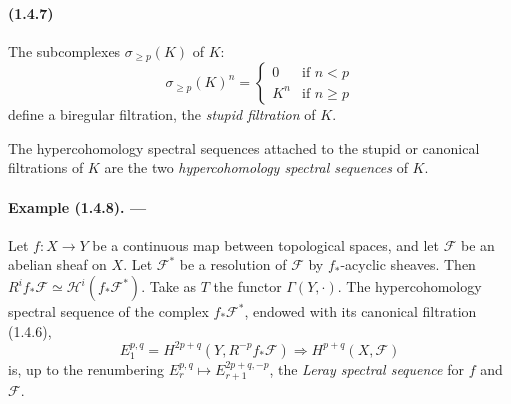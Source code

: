 \documentclass[10pt]{article}
\newcommand{\calH}{\mathcal H}
\newcommand{\calF}{\mathcal F}
\begin{document}
\paragraph{(1.4.7)} The subcomplexes $\sigma_{\ge p}(K)$ of $K$:
\[
\sigma_{\ge p}(K)^n=\begin{cases}
0& \text{if }n<p\\
K^n& \text{if }n\ge p
\end{cases}
\]
define a biregular filtration, the \emph{stupid filtration} of $K$.

The hypercohomology spectral sequences attached to the stupid or canonical filtrations of $K$ are the two \emph{hypercohomology spectral sequences} of $K$.

\paragraph{Example (1.4.8). ---} Let $f:X\to Y$ be a continuous map between topological spaces, and let $\calF$ be an abelian sheaf on $X$. Let $\calF^*$ be a resolution of $\calF$ by $f_*$-acyclic sheaves. Then $R^if_*\calF\simeq\calH^i(f_*\calF^*)$. Take as $T$ the functor $\Gamma(Y,\cdot)$. The hypercohomology spectral sequence of the complex $f_*\calF^*$, endowed with its canonical filtration (1.4.6),
\[
E_1^{p,q}=H^{2p+q}(Y,R^{-p}f_*\calF)\Rightarrow H^{p+q}(X,\calF)
\]
is, up to the renumbering $E_r^{p,q}\mapsto E_{r+1}^{2p+q,-p}$, the \emph{Leray spectral sequence} for $f$ and $\calF$.
\end{document}
